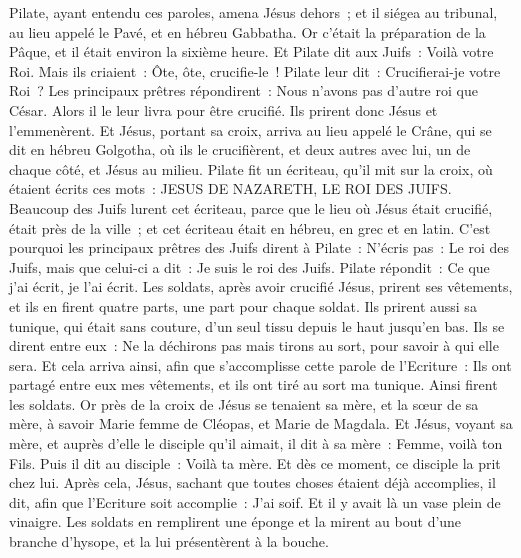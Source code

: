 \begin{multicols}{2}
Pilate, ayant entendu ces paroles, amena Jésus dehors~; et il siégea au tribunal, au lieu appelé le Pavé, et en hébreu Gabbatha.
Or c'était la préparation de la Pâque, et il était environ la sixième heure. Et Pilate dit aux Juifs~: Voilà votre Roi.
Mais ils criaient~: Ôte, ôte, crucifie-le~! Pilate leur dit~: Crucifierai-je votre Roi~? Les principaux prêtres répondirent~: Nous n'avons pas d'autre roi que César.
Alors il le leur livra pour être crucifié. Ils prirent donc Jésus et l'emmenèrent.
Et Jésus, portant sa croix, arriva au lieu appelé le Crâne, qui se dit en hébreu Golgotha,
où ils le crucifièrent, et deux autres avec lui, un de chaque côté, et Jésus au milieu.
Pilate fit un écriteau, qu'il mit sur la croix, où étaient écrits ces mots~: JESUS DE NAZARETH, LE ROI DES JUIFS.
Beaucoup des Juifs lurent cet écriteau, parce que le lieu où Jésus était crucifié, était près de la ville~; et cet écriteau était en hébreu, en grec et en latin.
C'est pourquoi les principaux prêtres des Juifs dirent à Pilate~: N'écris pas~: Le roi des Juifs, mais que celui-ci a dit~: Je suis le roi des Juifs.
Pilate répondit~: Ce que j'ai écrit, je l'ai écrit.
Les soldats, après avoir crucifié Jésus, prirent ses vêtements, et ils en firent quatre parts, une part pour chaque soldat. Ils prirent aussi sa tunique, qui était sans couture, d'un seul tissu depuis le haut jusqu'en bas.
Ils se dirent entre eux~: Ne la déchirons pas mais tirons au sort, pour savoir à qui elle sera. Et cela arriva ainsi, afin que s'accomplisse cette parole de l'Ecriture~: Ils ont partagé entre eux mes vêtements, et ils ont tiré au sort ma tunique. Ainsi firent les soldats.
Or près de la croix de Jésus se tenaient sa mère, et la sœur de sa mère, à savoir Marie femme de Cléopas, et Marie de Magdala.
Et Jésus, voyant sa mère, et auprès d'elle le disciple qu'il aimait, il dit à sa mère~: Femme, voilà ton Fils.
Puis il dit au disciple~: Voilà ta mère. Et dès ce moment, ce disciple la prit chez lui.
Après cela, Jésus, sachant que toutes choses étaient déjà accomplies, il dit, afin que l'Ecriture soit accomplie~: J'ai soif.
Et il y avait là un vase plein de vinaigre. Les soldats en remplirent une éponge et la mirent au bout d'une branche d'hysope, et la lui présentèrent à la bouche.

\end{multicols}
